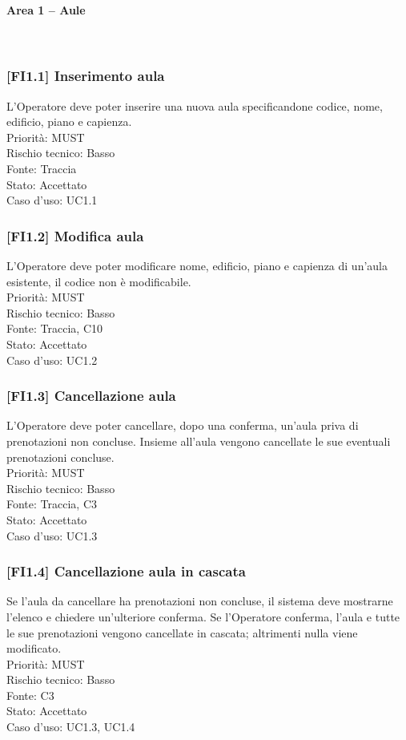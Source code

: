 \paragraph{Area 1 – Aule}~\\
\subsubsection{[FI1.1] Inserimento aula}
L'Operatore deve poter inserire una nuova aula specificandone codice, nome, edificio, piano e capienza.\\
Priorità: MUST\\Rischio tecnico: Basso\\Fonte: Traccia\\Stato: Accettato\\Caso d'uso: UC1.1

\subsubsection{[FI1.2] Modifica aula}
L'Operatore deve poter modificare nome, edificio, piano e capienza di un'aula esistente, il codice non è modificabile.\\
Priorità: MUST\\Rischio tecnico: Basso\\Fonte: Traccia, C10\\Stato: Accettato\\Caso d'uso: UC1.2

\subsubsection{[FI1.3] Cancellazione aula}
L'Operatore deve poter cancellare, dopo una conferma, un'aula priva di prenotazioni non concluse. Insieme all'aula vengono cancellate le sue eventuali prenotazioni concluse.\\
Priorità: MUST\\Rischio tecnico: Basso\\Fonte: Traccia, C3\\Stato: Accettato\\Caso d'uso: UC1.3

\subsubsection{[FI1.4] Cancellazione aula in cascata}
Se l'aula da cancellare ha prenotazioni non concluse, il sistema deve mostrarne l'elenco e chiedere un'ulteriore conferma. Se l'Operatore conferma, l'aula e tutte le sue prenotazioni vengono cancellate in cascata; altrimenti nulla viene modificato.\\
Priorità: MUST\\Rischio tecnico: Basso\\Fonte: C3\\Stato: Accettato\\Caso d'uso: UC1.3, UC1.4

